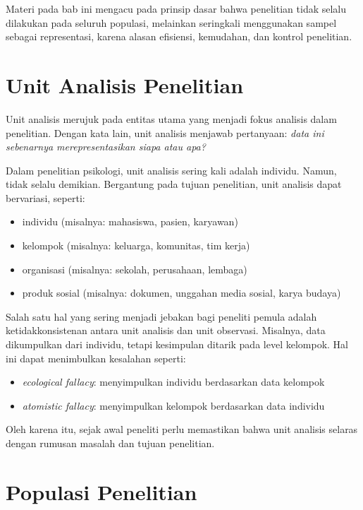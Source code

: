 \documentclass[
  indonesian,
  letterpaper,
  DIV=11,
  numbers=noendperiod]{scrreprt}
\providecommand{\tightlist}{%
  \setlength{\itemsep}{0pt}\setlength{\parskip}{0pt}}
\begin{document}
Materi pada bab ini mengacu pada prinsip dasar bahwa penelitian tidak
selalu dilakukan pada seluruh populasi, melainkan seringkali menggunakan
sampel sebagai representasi, karena alasan efisiensi, kemudahan, dan
kontrol penelitian.

\section{Unit Analisis Penelitian}\label{unit-analisis-penelitian}

Unit analisis merujuk pada entitas utama yang menjadi fokus analisis
dalam penelitian. Dengan kata lain, unit analisis menjawab pertanyaan:
\emph{data ini sebenarnya merepresentasikan siapa atau apa?}

Dalam penelitian psikologi, unit analisis sering kali adalah individu.
Namun, tidak selalu demikian. Bergantung pada tujuan penelitian, unit
analisis dapat bervariasi, seperti:

\begin{itemize}
\tightlist
\item
  individu (misalnya: mahasiswa, pasien, karyawan)
\item
  kelompok (misalnya: keluarga, komunitas, tim kerja)
\item
  organisasi (misalnya: sekolah, perusahaan, lembaga)
\item
  produk sosial (misalnya: dokumen, unggahan media sosial, karya budaya)
\end{itemize}

Salah satu hal yang sering menjadi jebakan bagi peneliti pemula adalah
ketidakkonsistenan antara unit analisis dan unit observasi. Misalnya,
data dikumpulkan dari individu, tetapi kesimpulan ditarik pada level
kelompok. Hal ini dapat menimbulkan kesalahan seperti:

\begin{itemize}
\tightlist
\item
  \emph{ecological fallacy}: menyimpulkan individu berdasarkan data
  kelompok
\item
  \emph{atomistic fallacy}: menyimpulkan kelompok berdasarkan data
  individu
\end{itemize}

Oleh karena itu, sejak awal peneliti perlu memastikan bahwa unit
analisis selaras dengan rumusan masalah dan tujuan penelitian.

\section{Populasi Penelitian}\label{populasi-penelitian}
\end{document}
